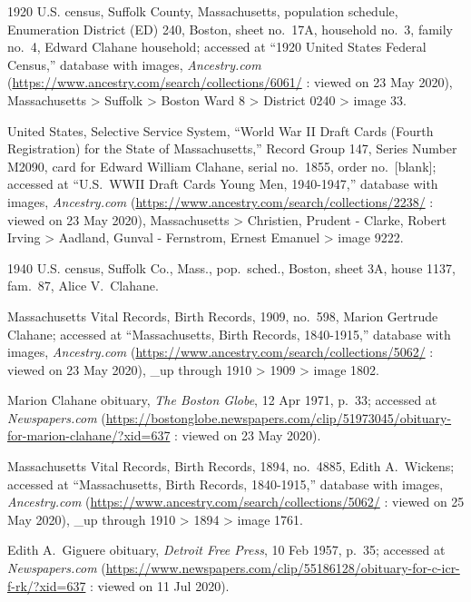 \begin{thebibliography}{999}
1920 U.S. census, Suffolk County, Massachusetts, population schedule, Enumeration District (ED) 240, Boston, sheet no.\ 17A, household no.\ 3, family no.\ 4, Edward Clahane household; accessed at ``1920 United States Federal Census,'' database with images, \textit{Ancestry.com} (\url{https://www.ancestry.com/search/collections/6061/} : viewed on 23 May 2020), Massachusetts > Suffolk > Boston Ward 8 > District 0240 > image 33.

United States, Selective Service System, ``World War II Draft Cards (Fourth Registration) for the State of Massachusetts,'' Record Group 147, Series Number M2090, card for Edward William Clahane, serial no.\ 1855, order no.\ [blank]; accessed at ``U.S.\ WWII Draft Cards Young Men, 1940-1947,'' database with images, \textit{Ancestry.com} (\url{https://www.ancestry.com/search/collections/2238/} : viewed on 23 May 2020), Massachusetts > Christien, Prudent - Clarke, Robert Irving > Aadland, Gunval - Fernstrom, Ernest Emanuel > image 9222.

1940 U.S. census, Suffolk Co., Mass., pop.\ sched., Boston, sheet 3A, house 1137, fam.\ 87, Alice V.\ Clahane.

Massachusetts Vital Records, Birth Records, 1909, no.\ 598, Marion Gertrude Clahane; accessed at ``Massachusetts, Birth Records, 1840-1915,'' database with images, \textit{Ancestry.com} (\url{https://www.ancestry.com/search/collections/5062/} : viewed on 23 May 2020), \_up through 1910 > 1909 > image 1802.

Marion Clahane obituary, \textit{The Boston Globe}, 12 Apr 1971, p.\ 33; accessed at \textit{Newspapers.com} (\url{https://bostonglobe.newspapers.com/clip/51973045/obituary-for-marion-clahane/?xid=637} : viewed on 23 May 2020).


Massachusetts Vital Records, Birth Records, 1894, no.\ 4885, Edith A.\ Wickens; accessed at ``Massachusetts, Birth Records, 1840-1915,'' database with images, \textit{Ancestry.com} (\url{https://www.ancestry.com/search/collections/5062/} : viewed on 25 May 2020), \_up through 1910 > 1894 > image 1761.

Edith A.\ Giguere obituary, \textit{Detroit Free Press}, 10 Feb 1957, p.\ 35; accessed at \textit{Newspapers.com} (\url{https://www.newspapers.com/clip/55186128/obituary-for-c-icr-f-rk/?xid=637} : viewed on 11 Jul 2020).


\end{thebibliography}
